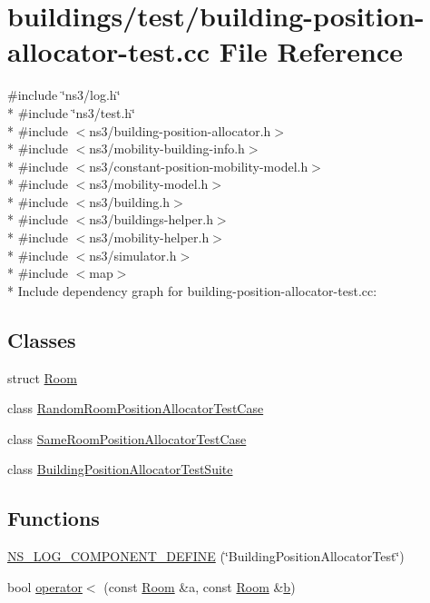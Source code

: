 \hypertarget{building-position-allocator-test_8cc}{}\section{buildings/test/building-\/position-\/allocator-\/test.cc File Reference}
\label{building-position-allocator-test_8cc}
{\ttfamily \#include \char`\"{}ns3/log.\+h\char`\"{}}\\*
{\ttfamily \#include \char`\"{}ns3/test.\+h\char`\"{}}\\*
{\ttfamily \#include $<$ns3/building-\/position-\/allocator.\+h$>$}\\*
{\ttfamily \#include $<$ns3/mobility-\/building-\/info.\+h$>$}\\*
{\ttfamily \#include $<$ns3/constant-\/position-\/mobility-\/model.\+h$>$}\\*
{\ttfamily \#include $<$ns3/mobility-\/model.\+h$>$}\\*
{\ttfamily \#include $<$ns3/building.\+h$>$}\\*
{\ttfamily \#include $<$ns3/buildings-\/helper.\+h$>$}\\*
{\ttfamily \#include $<$ns3/mobility-\/helper.\+h$>$}\\*
{\ttfamily \#include $<$ns3/simulator.\+h$>$}\\*
{\ttfamily \#include $<$map$>$}\\*
Include dependency graph for building-\/position-\/allocator-\/test.cc\+:
\subsection*{Classes}
\begin{DoxyCompactItemize}
\item 
struct \hyperlink{structRoom}{Room}
\item 
class \hyperlink{classRandomRoomPositionAllocatorTestCase}{Random\+Room\+Position\+Allocator\+Test\+Case}
\item 
class \hyperlink{classSameRoomPositionAllocatorTestCase}{Same\+Room\+Position\+Allocator\+Test\+Case}
\item 
class \hyperlink{classBuildingPositionAllocatorTestSuite}{Building\+Position\+Allocator\+Test\+Suite}
\end{DoxyCompactItemize}
\subsection*{Functions}
\begin{DoxyCompactItemize}
\item 
\hyperlink{building-position-allocator-test_8cc_a54d14eebfe2bbb8ac2c31bc2f8222bee}{N\+S\+\_\+\+L\+O\+G\+\_\+\+C\+O\+M\+P\+O\+N\+E\+N\+T\+\_\+\+D\+E\+F\+I\+NE} (\char`\"{}Building\+Position\+Allocator\+Test\char`\"{})
\item 
bool \hyperlink{building-position-allocator-test_8cc_ad0697714cc7bae2aeb1993cf6adb1da7}{operator$<$} (const \hyperlink{structRoom}{Room} \&a, const \hyperlink{structRoom}{Room} \&\hyperlink{lte__pathloss_8m_a21ad0bd836b90d08f4cf640b4c298e7c}{b})
\end{DoxyCompactItemize}

